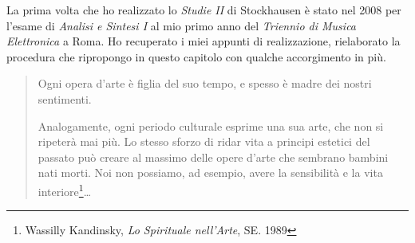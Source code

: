 \begin{multicols}{2}

	La prima volta che ho realizzato lo \emph{Studie II} di Stockhausen è stato nel 2008 per l'esame di \emph{Analisi e Sintesi I}
	al mio primo anno del \emph{Triennio di Musica Elettronica} a Roma. Ho recuperato i miei appunti di realizzazione, rielaborato la procedura che
	ripropongo in questo capitolo con qualche accorgimento in più.

\begin{quote}
	Ogni opera d'arte \`e figlia del suo tempo, e spesso \`e madre dei nostri
	sentimenti.

	Analogamente, ogni periodo culturale esprime una sua arte, che non si ripeter\`a mai pi\`u.
	Lo stesso sforzo di ridar vita a principi estetici del passato pu\`o creare al massimo delle opere d'arte che sembrano bambini nati morti.
	Noi non possiamo, ad esempio, avere la sensibilit\`a e la vita interiore\footnote{Wassilly Kandinsky, \emph{Lo Spirituale nell'Arte}, SE. 1989}\ldots
\end{quote}


\end{multicols}
